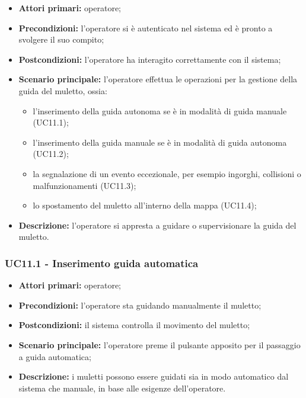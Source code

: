 \begin{itemize}
	\item 	\textbf{Attori primari:} operatore;
	\item 	\textbf{Precondizioni:} l'operatore si è autenticato nel sistema ed è pronto a svolgere il suo compito;
	\item 	\textbf{Postcondizioni:} l'operatore ha interagito correttamente con il sistema; 
	\item 	\textbf{Scenario principale:} l'operatore effettua le operazioni per la gestione della guida del muletto, ossia:
	\begin{itemize}
		\item l'inserimento della guida autonoma se è in modalità di guida manuale (UC11.1);
		\item l'inserimento della guida manuale se è in modalità di guida autonoma (UC11.2);
		\item la segnalazione di un evento eccezionale, per esempio ingorghi, collisioni o malfunzionamenti (UC11.3);
		\item lo spostamento del muletto all'interno della mappa (UC11.4);
	\end{itemize}
	\item 	\textbf{Descrizione:} l'operatore si appresta a guidare o supervisionare la guida del muletto. 

\end{itemize}

\subsubsection{UC11.1 - Inserimento guida automatica}
\begin{itemize}
	\item 	\textbf{Attori primari:} operatore;
	\item 	\textbf{Precondizioni:} l'operatore sta guidando manualmente il muletto;
	\item 	\textbf{Postcondizioni:} il sistema controlla il movimento del muletto;
	\item 	\textbf{Scenario principale:} l'operatore preme il pulsante apposito per il passaggio a guida automatica;
	\item 	\textbf{Descrizione:} i muletti possono essere guidati sia in modo automatico dal sistema che manuale, in base alle esigenze dell'operatore.
\end{itemize}


